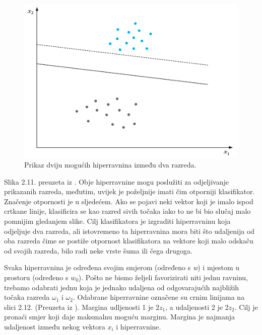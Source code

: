 \documentclass[times, utf8, zavrsni]{fer}
\begin{document}
\begin{figure}[htbp]
\centering
\includegraphics[scale=0.5]{img/linearniklasifikator.png}
\caption{Prikaz  dviju mogućih hiperravnina između dva razreda.}
\end{figure}

Slika 2.11. preuzeta iz \cite{pattern}. Obje 
hiperravnine mogu poslužiti za odjeljivanje prikazanih razreda, međutim, 
uvijek je poželjnije imati čim otporniji klasifikator. Značenje otpornosti je u 
sljedećem. Ako se pojavi neki vektor koji je imalo ispod crtkane linije, 
klasificira se kao razred sivih točaka iako to ne bi bio slučaj malo pomnijim 
gledanjem slike. Cilj klasifikatora je izgraditi hiperravninu koja odjeljuje dva 
razreda, ali istovremeno ta hiperravnina mora biti što udaljenija od oba razreda 
čime se postiže otpornost klasifikatora na vektore koji malo odskaču od svojih razreda, 
bilo radi neke vrste šuma ili čega drugoga. 

\bigbreak

Svaka hiperravnina je određena svojim smjerom (određeno s \textit{w}) i mjestom u prostoru (određeno s \(w_0\)). 
Pošto ne bismo željeli favorizirati niti jednu ravninu, trebamo odabrati jednu koja je 
jednako udaljena od odgovarajućih najbližih točaka razreda \(\omega_1\) i \(\omega_2\).  Odabrane hiperravnine 
označene su crnim linijama na slici 2.12. (Preuzeta iz \cite{pattern}). Margina udljenosti 1 je 2\(z_1\), a udaljenosti 2 je 2\(z_2\). 
Cilj je pronaći smjer koji daje maksmalnu moguću marginu. Margina je najmanja udaljenost 
između nekog vektora \(x_i\) i hiperravnine.
\end{document}

